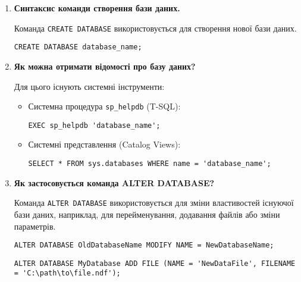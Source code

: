 \documentclass{article}
\begin{document}
\begin{enumerate}[label=\arabic*., leftmargin=*]
        \item \textbf{Синтаксис команди створення бази даних.}

        Команда \texttt{CREATE DATABASE} використовується для створення нової бази даних.
        \begin{CodeBox}
        \begin{verbatim}
CREATE DATABASE database_name;
        \end{verbatim}
        \end{CodeBox}
        
        \item \textbf{Як можна отримати відомості про базу даних?}

        Для цього існують системні інструменти:
        \begin{itemize}
            \item Системна процедура \texttt{sp\_helpdb} (T-SQL):
            \begin{CodeBox}[SQL]
            \begin{verbatim}
EXEC sp_helpdb 'database_name';
            \end{verbatim}
            \end{CodeBox}
            \item Системні представлення (Catalog Views):
            \begin{CodeBox}[SQL]
            \begin{verbatim}
SELECT * FROM sys.databases WHERE name = 'database_name';
            \end{verbatim}
            \end{CodeBox}
        \end{itemize}

        \item \textbf{Як застосовується команда ALTER DATABASE?}

        Команда \texttt{ALTER DATABASE} використовується для зміни властивостей існуючої бази даних, наприклад, для перейменування, додавання файлів або зміни параметрів.
        \begin{CodeBox}
        \begin{verbatim}
ALTER DATABASE OldDatabaseName MODIFY NAME = NewDatabaseName;
        \end{verbatim}
        \end{CodeBox}
        \begin{CodeBox}
        \begin{verbatim}
ALTER DATABASE MyDatabase ADD FILE (NAME = 'NewDataFile', FILENAME = 'C:\path\to\file.ndf');
        \end{verbatim}
        \end{CodeBox}


\end{enumerate}
\end{document}
